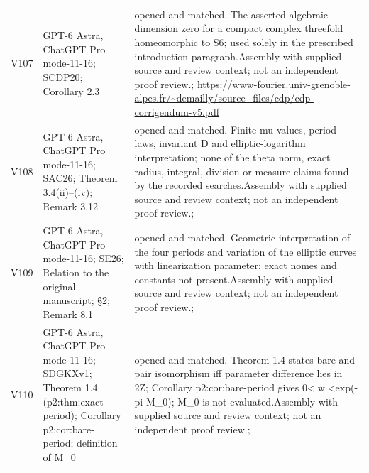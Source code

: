 \documentclass[11pt,a4paper]{article}
\theoremstyle{plain}
\theoremstyle{definition}
\begin{document}
\begin{longtable}{@{}L{.08\linewidth}L{.31\linewidth}L{.56\linewidth}@{}}
V107 & GPT-6 Astra, ChatGPT Pro mode-11-16; S\newline CDP20; Corollary 2.3 & opened and matched. The asserted algebraic dimension zero for a compact complex threefold homeomorphic to S6; used solely in the prescribed introduction paragraph.\newline Assembly with supplied source and review context; not an independent proof review.\newline {}; \url{https://www-fourier.univ-grenoble-alpes.fr/~demailly/source_files/cdp/cdp-corrigendum-v5.pdf}\\
V108 & GPT-6 Astra, ChatGPT Pro mode-11-16; S\newline AC26; Theorem 3.4(ii)--(iv); Remark 3.12 & opened and matched. Finite mu values, period laws, invariant D and elliptic-logarithm interpretation; none of the theta norm, exact radius, integral, division or measure claims found by the recorded searches.\newline Assembly with supplied source and review context; not an independent proof review.\newline {}; \\
V109 & GPT-6 Astra, ChatGPT Pro mode-11-16; S\newline E26; Relation to the original manuscript; §2; Remark 8.1 & opened and matched. Geometric interpretation of the four periods and variation of the elliptic curves with linearization parameter; exact nomes and constants not present.\newline Assembly with supplied source and review context; not an independent proof review.\newline {}; \\
V110 & GPT-6 Astra, ChatGPT Pro mode-11-16; S\newline DGKXv1; Theorem 1.4 (p2:\allowbreak{}thm:\allowbreak{}exact-period); Corollary p2:\allowbreak{}cor:\allowbreak{}bare-period; definition of M\_\allowbreak{}0 & opened and matched. Theorem 1.4 states bare and pair isomorphism iff parameter difference lies in 2Z; Corollary p2:\allowbreak{}cor:\allowbreak{}bare-period gives 0<|w|<exp(-pi M\_\allowbreak{}0); M\_\allowbreak{}0 is not evaluated.\newline Assembly with supplied source and review context; not an independent proof review.\newline {}; \\

\end{longtable}
\end{document}
